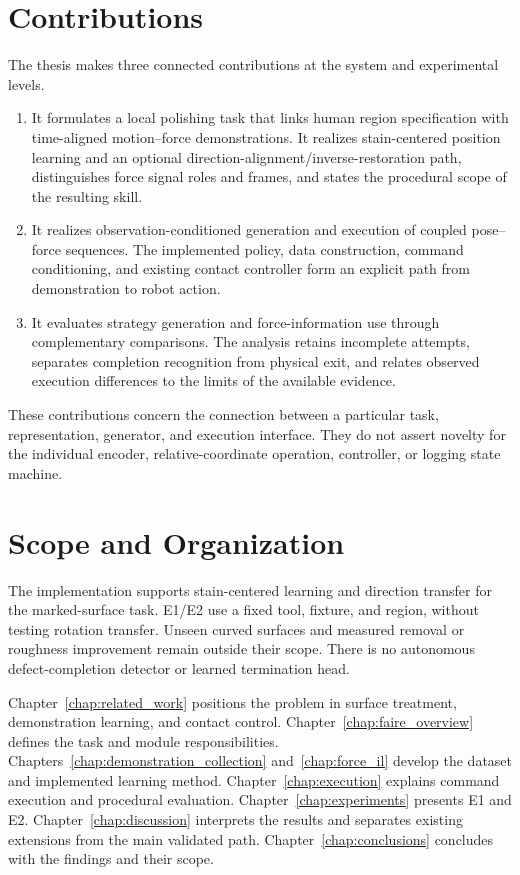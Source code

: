 \section{Contributions}
The thesis makes three connected contributions at the system and experimental levels.
\begin{enumerate}[leftmargin=0.8cm]
\item It formulates a local polishing task that links human region specification with time-aligned motion--force demonstrations. It realizes stain-centered position learning and an optional direction-alignment/inverse-restoration path, distinguishes force signal roles and frames, and states the procedural scope of the resulting skill.
\item It realizes observation-conditioned generation and execution of coupled pose--force sequences. The implemented policy, data construction, command conditioning, and existing contact controller form an explicit path from demonstration to robot action.
\item It evaluates strategy generation and force-information use through complementary comparisons. The analysis retains incomplete attempts, separates completion recognition from physical exit, and relates observed execution differences to the limits of the available evidence.
\end{enumerate}
These contributions concern the connection between a particular task, representation, generator, and execution interface. They do not assert novelty for the individual encoder, relative-coordinate operation, controller, or logging state machine.

\section{Scope and Organization}
The implementation supports stain-centered learning and direction transfer for the marked-surface task. E1/E2 use a fixed tool, fixture, and region, without testing rotation transfer. Unseen curved surfaces and measured removal or roughness improvement remain outside their scope. There is no autonomous defect-completion detector or learned termination head.

Chapter~\ref{chap:related_work} positions the problem in surface treatment, demonstration learning, and contact control. Chapter~\ref{chap:faire_overview} defines the task and module responsibilities. Chapters~\ref{chap:demonstration_collection} and~\ref{chap:force_il} develop the dataset and implemented learning method. Chapter~\ref{chap:execution} explains command execution and procedural evaluation. Chapter~\ref{chap:experiments} presents E1 and E2. Chapter~\ref{chap:discussion} interprets the results and separates existing extensions from the main validated path. Chapter~\ref{chap:conclusions} concludes with the findings and their scope.
